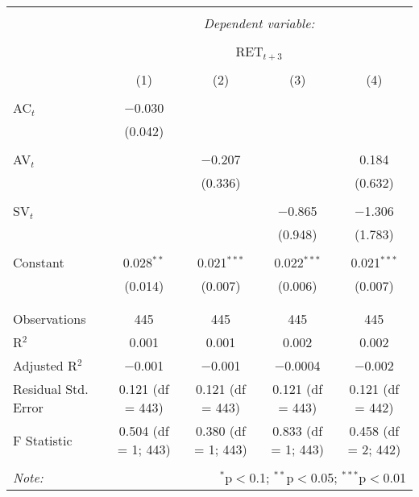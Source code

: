 
\begin{table}[!htbp] \centering 
  \caption{} 
  \label{} 
\begin{tabular}{@{\extracolsep{5pt}}lcccc} 
\\[-1.8ex]\hline 
\hline \\[-1.8ex] 
 & \multicolumn{4}{c}{\textit{Dependent variable:}} \\ 
\cline{2-5} 
\\[-1.8ex] & \multicolumn{4}{c}{RET$_{t+3}$} \\ 
\\[-1.8ex] & (1) & (2) & (3) & (4)\\ 
\hline \\[-1.8ex] 
 AC$_{t}$ & $-$0.030 &  &  &  \\ 
  & (0.042) &  &  &  \\ 
  & & & & \\ 
 AV$_{t}$ &  & $-$0.207 &  & 0.184 \\ 
  &  & (0.336) &  & (0.632) \\ 
  & & & & \\ 
 SV$_{t}$ &  &  & $-$0.865 & $-$1.306 \\ 
  &  &  & (0.948) & (1.783) \\ 
  & & & & \\ 
 Constant & 0.028$^{**}$ & 0.021$^{***}$ & 0.022$^{***}$ & 0.021$^{***}$ \\ 
  & (0.014) & (0.007) & (0.006) & (0.007) \\ 
  & & & & \\ 
\hline \\[-1.8ex] 
Observations & 445 & 445 & 445 & 445 \\ 
R$^{2}$ & 0.001 & 0.001 & 0.002 & 0.002 \\ 
Adjusted R$^{2}$ & $-$0.001 & $-$0.001 & $-$0.0004 & $-$0.002 \\ 
Residual Std. Error & 0.121 (df = 443) & 0.121 (df = 443) & 0.121 (df = 443) & 0.121 (df = 442) \\ 
F Statistic & 0.504 (df = 1; 443) & 0.380 (df = 1; 443) & 0.833 (df = 1; 443) & 0.458 (df = 2; 442) \\ 
\hline 
\hline \\[-1.8ex] 
\textit{Note:}  & \multicolumn{4}{r}{$^{*}$p$<$0.1; $^{**}$p$<$0.05; $^{***}$p$<$0.01} \\ 
\end{tabular} 
\end{table} 
